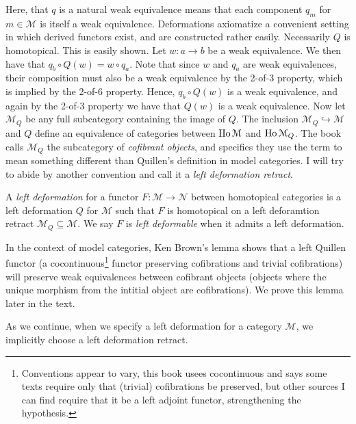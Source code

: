 Here, that $q$ is a natural weak equivalence means that each component $q_m$ for $m\in \mathcal{M} $ is itself a weak equivalence. Deformations axiomatize a convenient setting in which derived functors exist, and are constructed rather easily. Necessarily $Q$ is homotopical. This is easily shown. Let $w : a \to b$ be a weak equivalence. We then have that $q_b \circ Q(w)=w\circ q_a$. Note that since $w$ and $q_a$ are weak equivalences, their composition must also be a weak equivalence by the 2-of-3 property, which is implied by the 2-of-6 property. Hence, $q_b \circ Q(w)$ is a weak equivalence, and again by the 2-of-3 property we have that $Q(w)$ is a weak equivalence. Now let $\mathcal{M}_Q$ be any full subcategory containing the image of $Q$. The inclusion $\mathcal{M} _Q\hookrightarrow \mathcal{M} $ and $Q$ define an equivalence of categories between $\operatorname{Ho} \mathcal{M} $ and $\operatorname{Ho} \mathcal{M} _Q$. The book calls $\mathcal{M} _Q$ the subcategory of \emph{cofibrant objects}, and specifies they use the term to mean something different than Quillen's definition in model categories. I will try to abide by another convention and call it a \emph{left deformation retract}.

\begin{definition}\label{dfn:2.7}
	A \emph{left deformation} for a functor $F : \mathcal{M}  \to \mathcal{N} $ between homotopical categories is a left deformation $Q$ for $\mathcal{M} $ such that $F$ is homotopical on a left deforamtion retract $\mathcal{M} _Q\subseteq \mathcal{M} $. We say $F$ is \emph{left deformable} when it admits a left deformation.
\end{definition}

In the context of model categories, Ken Brown's lemma shows that a left Quillen functor (a cocontinuous\footnote{Conventions appear to vary, this book usees cocontinuous and says some texts require only that (trivial) cofibrations be preserved, but other sources I can find require that it be a left adjoint functor, strengthening the hypothesis.} functor preserving cofibrations and trivial cofibrations) will preserve weak equivalences between cofibrant objects (objects where the unique morphism from the intitial object are cofibrations). We prove this lemma later in the text.

As we continue, when we specify a left deformation for a category $\mathcal{M} $, we implicitly choose a left deformation retract.

